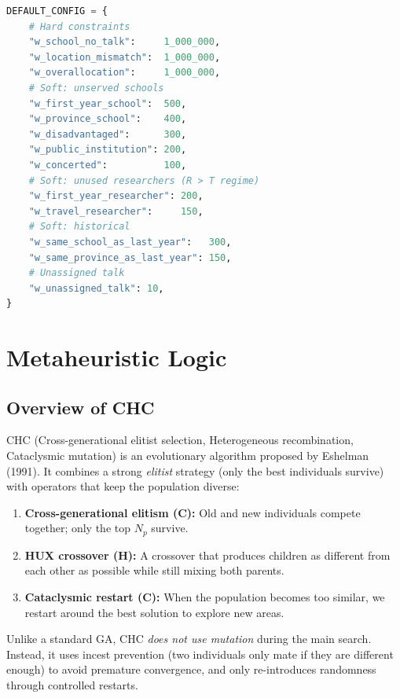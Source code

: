 \documentclass[12pt, a4paper]{article}
\begin{document}
\begin{lstlisting}[language=Python, caption={Configurable weight dictionary}]
DEFAULT_CONFIG = {
    # Hard constraints
    "w_school_no_talk":     1_000_000,
    "w_location_mismatch":  1_000_000,
    "w_overallocation":     1_000_000,
    # Soft: unserved schools
    "w_first_year_school":  500,
    "w_province_school":    400,
    "w_disadvantaged":      300,
    "w_public_institution": 200,
    "w_concerted":          100,
    # Soft: unused researchers (R > T regime)
    "w_first_year_researcher": 200,
    "w_travel_researcher":     150,
    # Soft: historical
    "w_same_school_as_last_year":   300,
    "w_same_province_as_last_year": 150,
    # Unassigned talk
    "w_unassigned_talk": 10,
}
\end{lstlisting}

\section{Metaheuristic Logic}

\subsection{Overview of CHC}

CHC (Cross-generational elitist selection, Heterogeneous recombination, Cataclysmic
mutation) is an evolutionary algorithm proposed by Eshelman (1991). It combines a
strong \emph{elitist} strategy (only the best individuals survive) with operators
that keep the population diverse:
\begin{enumerate}[itemsep=0.2em]
  \item \textbf{Cross-generational elitism (C):} Old and new individuals compete
        together; only the top $N_p$ survive.
  \item \textbf{HUX crossover (H):} A crossover that produces children as different
        from each other as possible while still mixing both parents.
  \item \textbf{Cataclysmic restart (C):} When the population becomes too similar,
        we restart around the best solution to explore new areas.
\end{enumerate}

Unlike a standard GA, CHC \emph{does not use mutation} during the main search.
Instead, it uses incest prevention (two individuals only mate if they are different
enough) to avoid premature convergence, and only re-introduces randomness through
controlled restarts.
\end{document}
